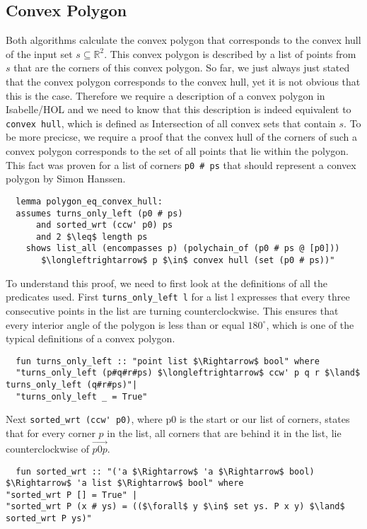\subsection{Convex Polygon}
\label{sec:conv_poly}
Both algorithms calculate the convex polygon that corresponds to the 
convex hull of the input set $s \subseteq \mathbb{R}^2$. This convex polygon 
is described by a list of points from $s$ that are the corners of this convex polygon.
So far, we just always just stated that the convex polygon corresponds to the 
convex hull, yet it is not obvious that this is the case. Therefore we require a  
description of a convex polygon in Isabelle/HOL and we need 
to know that this description is indeed equivalent to \lstinline|convex hull|, which is defined 
as Intersection of all convex sets that contain $s$. 
To be more precicse, we require a proof that the convex hull of the corners of such a 
convex polygon corresponds to the set of all points that lie within the polygon.
This fact was proven for a list of corners \lstinline|p0 # ps| that should
represent a convex polygon by Simon Hanssen.
\begin{lstlisting}
  lemma polygon_eq_convex_hull:
  assumes turns_only_left (p0 # ps)
      and sorted_wrt (ccw' p0) ps
      and 2 $\leq$ length ps
    shows list_all (encompasses p) (polychain_of (p0 # ps @ [p0]))
       $\longleftrightarrow$ p $\in$ convex hull (set (p0 # ps))"
\end{lstlisting}
To understand this proof, we need to first look at the definitions of all the predicates
used. First \lstinline|turns_only_left l| for a list l expresses that every three consecutive
points in the list are turning counterclockwise. This ensures that every interior angle of 
the polygon is less than or equal $180^\circ$, which is one of the typical definitions
of a convex polygon.
\begin{lstlisting}
  fun turns_only_left :: "point list $\Rightarrow$ bool" where
  "turns_only_left (p#q#r#ps) $\longleftrightarrow$ ccw' p q r $\land$ turns_only_left (q#r#ps)"|
  "turns_only_left _ = True"
\end{lstlisting}
Next \lstinline|sorted_wrt (ccw' p0)|, where p0 is the start or our list of corners, states that
for every corner $p$ in the list, all corners that are behind it in the list, lie counterclockwise
of $\overrightarrow{p0  p}$.
\begin{lstlisting}
  fun sorted_wrt :: "('a $\Rightarrow$ 'a $\Rightarrow$ bool) $\Rightarrow$ 'a list $\Rightarrow$ bool" where
"sorted_wrt P [] = True" |
"sorted_wrt P (x # ys) = (($\forall$ y $\in$ set ys. P x y) $\land$ sorted_wrt P ys)"
\end{lstlisting}     
